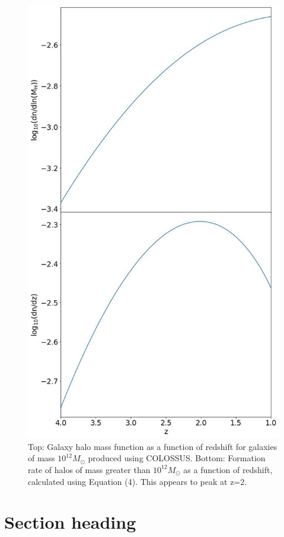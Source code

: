 \documentclass[12pt, twocolumn]{revtex4}    %
\begin{document}
\onecolumngrid


\begin{figure}[H]
\centering
\includegraphics[width=12cm]{Plot_6.jpeg}
\caption{Top: Galaxy halo mass function as a function of redshift for galaxies of mass $10^{12}M_\odot$ produced using COLOSSUS. Bottom: Formation rate of halos of mass greater than $10^{12}M_\odot$ as a function of redshift, calculated using Equation (4). This appears to peak at z=2.}
\label{fig:8}
\end{figure}
\twocolumngrid


\section{Section heading}
\end{document}
